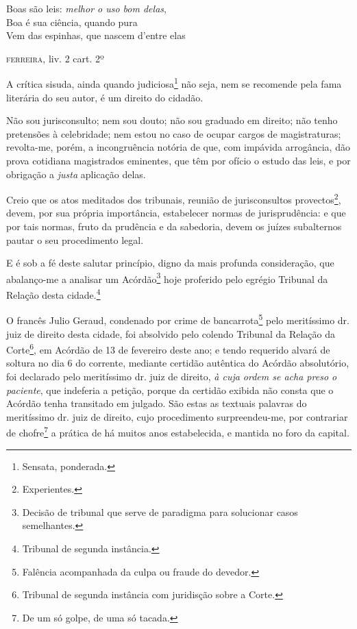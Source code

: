 \epigraph{Boas são leis: \emph{melhor o uso bom delas},\\
Boa é sua ciência, quando pura\\
Vem das espinhas, que nascem d'entre elas}{\textsc{ferreira}\footnotemark, liv. 2
cart. 2º\footnotemark}



A crítica sisuda, ainda quando judiciosa\footnote{ Sensata, ponderada.}
não seja, nem se recomende pela fama literária do seu autor, é um
direito do cidadão.

Não sou jurisconsulto; nem sou douto; não sou graduado em direito; não
tenho pretensões à celebridade; nem estou no caso de ocupar cargos de
magistraturas; revolta-me, porém, a incongruência notória de que, com
impávida arrogância, dão prova cotidiana magistrados eminentes, que têm
por ofício o estudo das leis, e por obrigação a \emph{justa} aplicação
delas.

Creio que os atos meditados dos tribunais, reunião de jurisconsultos
provectos\footnote{ Experientes.}, devem, por sua própria importância,
estabelecer normas de jurisprudência: e que por tais normas, fruto da
prudência e da sabedoria, devem os juízes subalternos pautar o seu
procedimento legal.

E é sob a fé deste salutar princípio, digno da mais profunda
consideração, que abalanço-me a analisar um Acórdão\footnote{ Decisão
  de tribunal que serve de paradigma para solucionar casos semelhantes.}
hoje proferido pelo egrégio Tribunal da Relação desta cidade.\footnote{
  Tribunal de segunda instância.}

O francês Julio Geraud, condenado por crime de bancarrota\footnote{
  Falência acompanhada da culpa ou fraude do devedor.} pelo meritíssimo
dr. juiz de direito desta cidade, foi absolvido pelo colendo Tribunal da
Relação da Corte\footnote{ Tribunal de segunda instância com juridisção
  sobre a Corte.}, em Acórdão de 13 de fevereiro deste ano; e tendo
requerido alvará de soltura no dia 6 do corrente, mediante certidão
autêntica do Acórdão absolutório, foi declarado pelo meritíssimo dr.
juiz de direito, \emph{à cuja ordem se acha preso o paciente}, que
indeferia a petição, porque da certidão exibida não consta que o Acórdão
tenha transitado em julgado. São estas as textuais palavras do
meritíssimo dr. juiz de direito, cujo procedimento surpreendeu-me, por
contrariar de chofre\footnote{ De um só golpe, de uma só tacada.} a
prática de há muitos anos estabelecida, e mantida no foro da capital.

